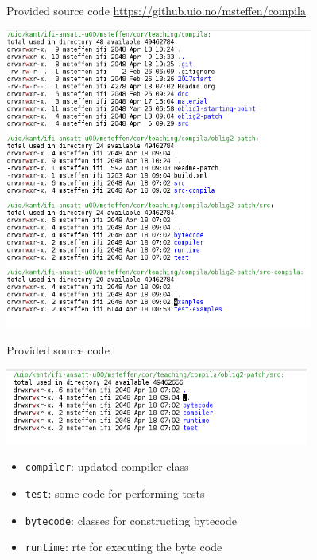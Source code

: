 \documentclass{beamer}
\begin{document}
\begin{frame}[label={sec:org7248cd9}]{Provided source code}
\url{https://github.uio.no/msteffen/compila}

\includegraphics[width=0.76\textwidth]{figures/snaps/directorystruct}
\end{frame}



\begin{frame}[fragile,label={sec:org6bdefa5}]{Provided source code}

 \begin{center}
 \includegraphics[width=0.75\textwidth]{figures/snaps/directory-src}
\end{center}



\begin{itemize}
\item \texttt{compiler}: updated compiler class
\item \texttt{test}:   some code for performing tests
\item \texttt{bytecode}: classes for constructing bytecode
\item \texttt{runtime}: rte for executing the byte code
\end{itemize}
\end{frame}
\end{document}
